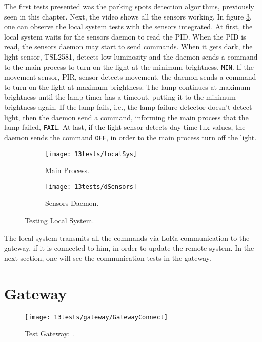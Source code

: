 The first tests presented was the parking spots detection algorithms, previously seen in this chapter. Next, the video shows all the sensors working. In figure \ref{fig:localSys}, one can observe the local system tests with the sensors integrated. At first, the local system waits for the sensors daemon to read the PID. When the PID is read, the sensors daemon may start to send commands. When it gets dark, the light sensor, TSL2581, detects low luminosity and the daemon sends a command to the main process to turn on the light at the minimum brightness, \verb|MIN|. If the movement sensor, PIR, sensor detects movement, the daemon sends a command to turn on the light at maximum brightness. The lamp continues at maximum brightness until the lamp timer has a timeout, putting it to the minimum brightness again. If the lamp fails, i.e., the lamp failure detector doesn't detect light, then the daemon send a command, informing the main process that the lamp failed, \verb|FAIL|. At last, if the light sensor detects day time lux values, the daemon sends the command \verb|OFF|, in order to the main process turn off the light. 

\begin{figure}[H]
	\centering
	\begin{subfigure}{.4\textwidth}
		\centering	
		\texttt{[image: 13tests/localSys]}
		\caption{Main Process.}
		\label{fig:main}
	\end{subfigure}%
	\begin{subfigure}{.4\textwidth}
		\centering
		\texttt{[image: 13tests/dSensors]}
		\caption{Sensors Daemon.}
		\label{fig:dSensors}
	\end{subfigure}
	\caption{Testing Local System.}
	\label{fig:localSys}
\end{figure}

The local system transmits all the commands via LoRa communication to the gateway, if it is connected to him, in order to update the remote system. In the next section, one will see the communication tests in the gateway.


\section{Gateway}


\begin{figure}[H]
	\centering	
	\texttt{[image: 13tests/gateway/GatewayConnect]}
	\caption{Test Gateway: .}
	\label{fig:}
\end{figure}

